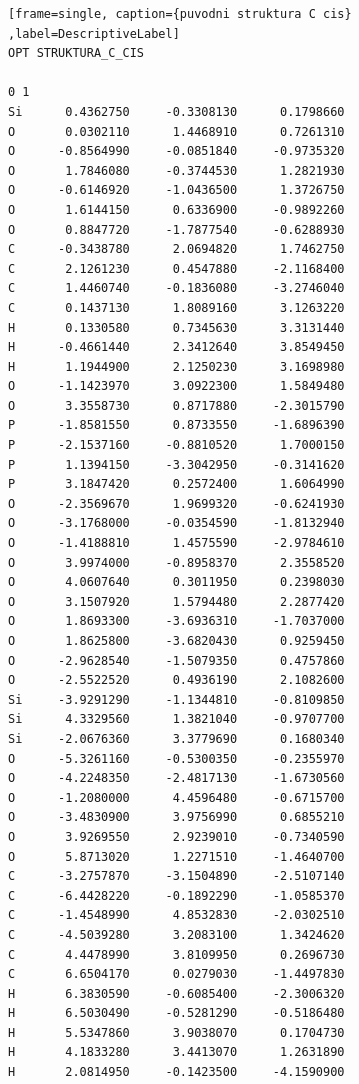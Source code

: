 \documentclass[
digital, %
table,   %
nolof,     %
nolot,     %
oneside,
]{fithesis3}
\begin{document}
\newpage

\begin{lstlisting}[frame=single, caption={puvodni struktura C cis} ,label=DescriptiveLabel]
OPT STRUKTURA_C_CIS

0 1
Si      0.4362750     -0.3308130      0.1798660
O       0.0302110      1.4468910      0.7261310
O      -0.8564990     -0.0851840     -0.9735320
O       1.7846080     -0.3744530      1.2821930
O      -0.6146920     -1.0436500      1.3726750
O       1.6144150      0.6336900     -0.9892260
O       0.8847720     -1.7877540     -0.6288930
C      -0.3438780      2.0694820      1.7462750
C       2.1261230      0.4547880     -2.1168400
C       1.4460740     -0.1836080     -3.2746040
C       0.1437130      1.8089160      3.1263220
H       0.1330580      0.7345630      3.3131440
H      -0.4661440      2.3412640      3.8549450
H       1.1944900      2.1250230      3.1698980
O      -1.1423970      3.0922300      1.5849480
O       3.3558730      0.8717880     -2.3015790
P      -1.8581550      0.8733550     -1.6896390
P      -2.1537160     -0.8810520      1.7000150
P       1.1394150     -3.3042950     -0.3141620
P       3.1847420      0.2572400      1.6064990
O      -2.3569670      1.9699320     -0.6241930
O      -3.1768000     -0.0354590     -1.8132940
O      -1.4188810      1.4575590     -2.9784610
O       3.9974000     -0.8958370      2.3558520
O       4.0607640      0.3011950      0.2398030
O       3.1507920      1.5794480      2.2877420
O       1.8693300     -3.6936310     -1.7037000
O       1.8625800     -3.6820430      0.9259450
O      -2.9628540     -1.5079350      0.4757860
O      -2.5522520      0.4936190      2.1082600
Si     -3.9291290     -1.1344810     -0.8109850
Si      4.3329560      1.3821040     -0.9707700
Si     -2.0676360      3.3779690      0.1680340
O      -5.3261160     -0.5300350     -0.2355970
O      -4.2248350     -2.4817130     -1.6730560
O      -1.2080000      4.4596480     -0.6715700
O      -3.4830900      3.9756990      0.6855210
O       3.9269550      2.9239010     -0.7340590
O       5.8713020      1.2271510     -1.4640700
C      -3.2757870     -3.1504890     -2.5107140
C      -6.4428220     -0.1892290     -1.0585370
C      -1.4548990      4.8532830     -2.0302510
C      -4.5039280      3.2083100      1.3424620
C       4.4478990      3.8109950      0.2696730
C       6.6504170      0.0279030     -1.4497830
H       6.3830590     -0.6085400     -2.3006320
H       6.5030490     -0.5281290     -0.5186480
H       5.5347860      3.9038070      0.1704730
H       4.1833280      3.4413070      1.2631890
H       2.0814950     -0.1423500     -4.1590900

\end{lstlisting}
\end{document}

